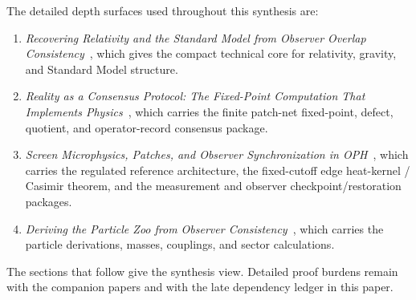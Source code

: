 \documentclass[11pt]{article}
\begin{document}
The detailed depth surfaces used throughout this synthesis are:
\begin{enumerate}[leftmargin=2em]
\item \emph{Recovering Relativity and the Standard Model from Observer Overlap Consistency}~\cite{ophcompact}, which gives the compact technical core for relativity, gravity, and Standard Model structure.
\item \emph{Reality as a Consensus Protocol: The Fixed-Point Computation That Implements Physics}~\cite{ophconsensus}, which carries the finite patch-net fixed-point, defect, quotient, and operator-record consensus package.
\item \emph{Screen Microphysics, Patches, and Observer Synchronization in OPH}~\cite{ophmicrophysics}, which carries the regulated reference architecture, the fixed-cutoff edge heat-kernel / Casimir theorem, and the measurement and observer checkpoint/restoration packages.
\item \emph{Deriving the Particle Zoo from Observer Consistency}~\cite{ophparticles}, which carries the particle derivations, masses, couplings, and sector calculations.
\end{enumerate}

The sections that follow give the synthesis view. Detailed proof burdens remain with the companion
papers and with the late dependency ledger in this paper.

\def\OPHSkipEmbeddedReferences{1}



\appendix


\end{document}

